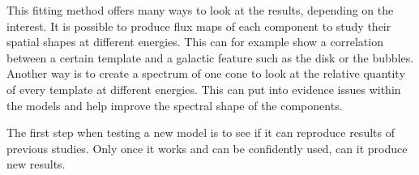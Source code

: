 
This fitting method offers many ways to look at the results, depending on the interest. It is possible to produce flux maps of each component to study their spatial shapes at different energies. This can for example show a correlation between a certain template and a galactic feature such as the disk or the bubbles. Another way is to create a spectrum of one cone to look at the relative quantity of every template at different energies. This can put into evidence issues within the models and help improve the spectral shape of the components.

The first step when testing a new model is to see if it can reproduce results of previous studies. Only once it works and can be confidently used, can it produce new results.




